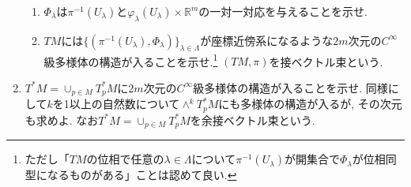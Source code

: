 \documentclass[dvipdfmx,a4paper,11pt]{article}
\newcommand{\R}{\mathbb{R}}
\theoremstyle{definition}
\begin{document}
\begin{enumerate}[label=\textbf{問}\ref*{sec-mfd-diff}.\arabic*]
\begin{enumerate}
\item $\Phi_{\lambda}$は$\pi^{-1}(U_{\lambda})$と$\varphi_{\lambda}(U_{\lambda}) \times \R^{m} $の一対一対応を与えることを示せ.
\item $TM$には$\{( \pi^{-1}(U_{\lambda}), \Phi_{\lambda} )\}_{\lambda \in \Lambda}$が座標近傍系になるような$2m$次元の$C^{\infty}$級多様体の構造が入ることを示せ.\footnote{ただし「$TM$の位相で任意の$\lambda \in \Lambda$について$\pi^{-1}(U_{\lambda})$が開集合で$\Phi_{\lambda}$が位相同型になるものがある」ことは認めて良い. } 
$(TM, \pi)$を接ベクトル束という. 
\end{enumerate}


\item $T^{*}M = \cup_{p \in M}T_{p}^{*}M$に$2m$次元の$C^{\infty}$級多様体の構造が入ることを示せ. 同様にして$k$を1以上の自然数について$\wedge^{k}T_{p}^{*}M$にも多様体の構造が入るが, その次元も求めよ. なお$T^{*}M = \cup_{p \in M}T_{p}^{*}M$を余接ベクトル束という. 



\end{enumerate}
\end{document}
